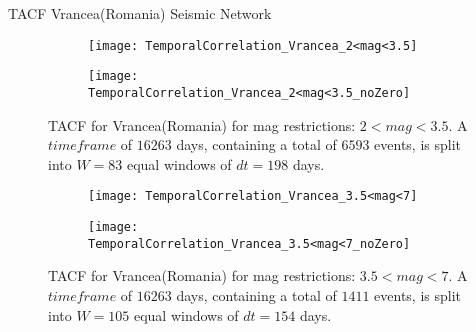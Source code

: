 \begin{frame}{TACF Vrancea(Romania) Seismic Network}
\begin{figure}[!ht]
\begin{subfigure}{.5\textwidth}
  \centering
  \texttt{[image: TemporalCorrelation\_Vrancea\_2<mag<3.5]}
  \label{fig:corrVrancea2_3.5}
\end{subfigure}%
\begin{subfigure}{.5\textwidth}
  \centering
  \texttt{[image: TemporalCorrelation\_Vrancea\_2<mag<3.5\_noZero]}
  \label{fig:corrVrancea2_3.5_noZero}
\end{subfigure}
\caption{TACF for Vrancea(Romania) for mag restrictions: $2<mag<3.5$. A $timeframe$ of $16263$ days, containing a total of $6593$ events, is split into $W=83$ equal windows of $dt=198$ days.}
\label{fig:corrVrancea2_3.5!}
\end{figure}

\begin{figure}[!ht]
\begin{subfigure}{.5\textwidth}
  \centering
  \texttt{[image: TemporalCorrelation\_Vrancea\_3.5<mag<7]}
  \label{fig:corrVrancea3.5_7}
\end{subfigure}%
\begin{subfigure}{.5\textwidth}
  \centering
  \texttt{[image: TemporalCorrelation\_Vrancea\_3.5<mag<7\_noZero]}
  \label{fig:corrVrancea3.5_7_noZero}
\end{subfigure}
\caption{TACF for Vrancea(Romania) for mag restrictions: $3.5<mag<7$. A $timeframe$ of $16263$ days, containing a total of $1411$ events, is split into $W=105$ equal windows of $dt=154$ days.}
\label{fig:corrVrancea3.5_7!}
\end{figure}
\end{frame}


